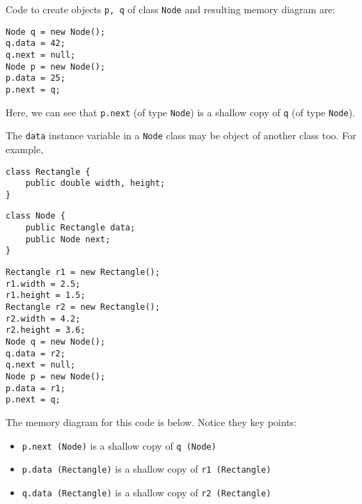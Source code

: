 Code to create objects \texttt{p, q} of class \texttt{Node} and resulting memory diagram are:

\begin{lstlisting}
Node q = new Node();
q.data = 42;
q.next = null;
Node p = new Node();
p.data = 25;
p.next = q;
\end{lstlisting}

\begin{center}
\bgroup \tikzset{png export}  \egroup
\end{center}

Here, we can see that \texttt{p.next} (of type \texttt{Node}) is a shallow copy of \texttt{q} (of type \texttt{Node}).

The \texttt{data} instance variable in a \texttt{Node} class may be object of another class too. For example,

\begin{lstlisting}
class Rectangle {
	public double width, height;
}  
\end{lstlisting}

\begin{lstlisting}
class Node {
	public Rectangle data;
	public Node next;
}
\end{lstlisting}

\begin{lstlisting}
Rectangle r1 = new Rectangle();
r1.width = 2.5;
r1.height = 1.5;
Rectangle r2 = new Rectangle();
r2.width = 4.2;
r2.height = 3.6;
Node q = new Node();
q.data = r2;
q.next = null;
Node p = new Node();
p.data = r1;
p.next = q;
\end{lstlisting}

The memory diagram for this code is below. Notice they key points:

\begin{itemize}
\item \texttt{p.next (Node)} is a shallow copy of \texttt{q (Node)}
\item \texttt{p.data (Rectangle)} is a shallow copy of \texttt{r1 (Rectangle)}
\item \texttt{q.data (Rectangle)} is a shallow copy of \texttt{r2 (Rectangle)}
\end{itemize}

